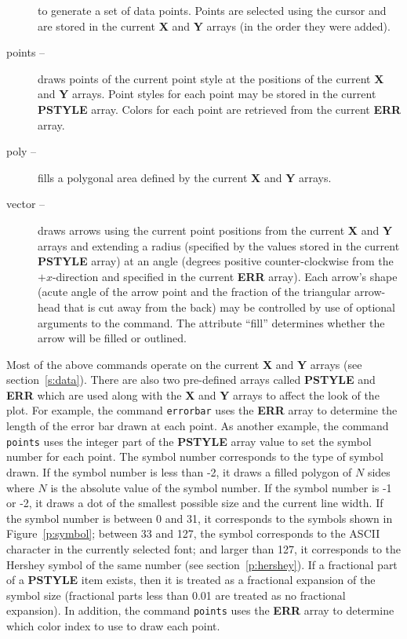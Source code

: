 \begin{description}
    to generate a set of data points.
    Points are selected using the cursor and are
    stored in the current {\bf X} and {\bf Y} arrays
    (in the order they were added).
  \item [{points --}] draws points of
    the current point style at the positions of the current {\bf X} and
    {\bf Y} arrays.
    Point styles for each point may be stored in the current {\bf PSTYLE} array.
    Colors for each point are retrieved from the current {\bf ERR} array.
  \item [{poly --}] fills a polygonal area
    defined by the current {\bf X} and {\bf Y} arrays.
  \item [{vector --}] draws arrows using
    the current point positions from the current {\bf X} and {\bf Y} arrays
    and extending a radius (specified by the values
    stored in the current {\bf PSTYLE} array) at an angle (degrees
    positive counter-clockwise from the $+x$-direction
    and specified in the current {\bf ERR} array).
    Each arrow's shape (acute angle of the arrow point and
    the fraction of the triangular arrow-head that is cut away from the back)
    may be controlled by use of optional arguments to the command.
    The attribute ``fill'' determines whether
    the arrow will be filled or outlined.
\end{description}

Most of the above commands operate on the current {\bf X} and {\bf Y}
arrays (see section~\ref{s:data}).
There are also two pre-defined arrays called {\bf PSTYLE} and {\bf ERR} which
are used along with the {\bf X} and {\bf Y} arrays to affect the look of
the plot.
For example, the command {\tt errorbar}
uses the {\bf ERR} array to determine the length of the error bar drawn
at each point.
As another example, the command {\tt points}
uses the integer part of the {\bf PSTYLE} array value
to set the symbol number for each point.
The symbol
number
corresponds to the type of symbol drawn.
If the symbol number is less than -2,
it draws a filled polygon
of $N$ sides where $N$ is the absolute value of the symbol number.
If the symbol number is -1 or -2, it draws a dot
of the smallest possible size and the current line width.
If the symbol number is between 0 and 31, it corresponds to the symbols
shown in Figure~\ref{p:symbol};
between 33 and 127, the symbol corresponds to the ASCII
character in the currently selected font;
and larger than 127, it corresponds to
the Hershey symbol
of the same number
(see section~\ref{p:hershey}).
If a fractional part of a {\bf PSTYLE} item exists,
then it is treated as a fractional expansion of the symbol size
(fractional parts less than 0.01 are treated as no fractional expansion).
In addition, the command {\tt points}
uses the {\bf ERR} array to determine which color index to use to draw
each point.


